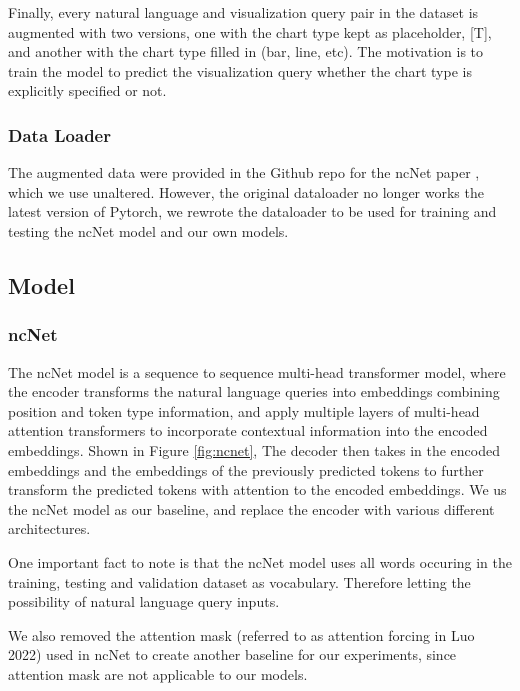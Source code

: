 \documentclass[
	a4paper, %
	10pt, %
	unnumberedsections, %
	twoside, %
]{t0003}
\begin{document}
Finally, every natural language and visualization query pair in the dataset is augmented with two versions, one with the chart type kept as placeholder, [T], and another with the chart type filled in (bar, line, etc). The motivation is to train the model to predict the visualization query whether the chart type is explicitly specified or not.

\subsubsection{Data Loader}

The augmented data were provided in the Github repo for the ncNet paper\cite{Luo:2022qr} , which we use unaltered. However, the original dataloader no longer works the latest version of Pytorch, we rewrote the dataloader to be used for training and testing the ncNet model and our own models.

\subsection{Model}

\subsubsection{ncNet}

The ncNet\cite{Luo:2022qr} model is a sequence to sequence multi-head transformer model, where the encoder transforms the natural language queries into embeddings combining position and token type information, and apply multiple layers of multi-head attention transformers to incorporate contextual information into the encoded embeddings. Shown in Figure  \ref{fig:ncnet},  The decoder then takes in the encoded embeddings and the embeddings of the previously predicted tokens to further transform the predicted tokens with attention to the encoded embeddings. We us the ncNet model as our baseline, and replace the encoder with various different architectures.

One important fact to note is that the ncNet model uses all words occuring in the training, testing and validation dataset as vocabulary. Therefore letting the possibility of natural language query inputs.

We also removed the attention mask (referred to as attention forcing in Luo 2022\cite{Luo:2022qr}) used in ncNet to create another baseline for our experiments, since attention mask are not applicable to our models.
\end{document}
